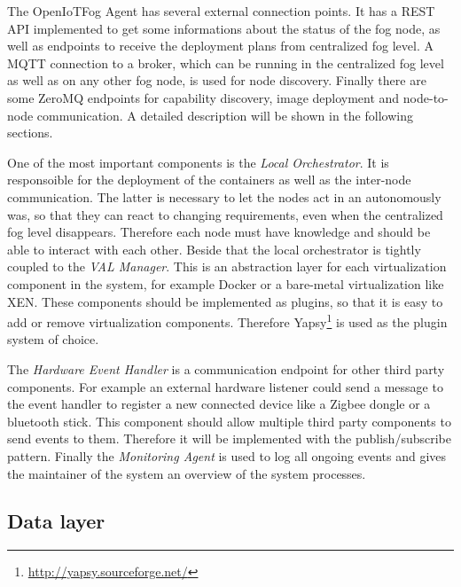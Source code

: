 The OpenIoTFog Agent has several external connection points.
It has a \ac{REST} \ac{API} implemented to get some informations about the status of the fog node, as well as endpoints to receive the deployment plans from centralized fog level.
A \ac{MQTT} connection to a broker, which can be running in the centralized fog level as well as on any other fog node, is used for node discovery.
Finally there are some ZeroMQ endpoints for capability discovery, image deployment and node-to-node communication.
A detailed description will be shown in the following sections.

One of the most important components is the \textit{Local Orchestrator}.
It is responsoible for the deployment of the containers as well as the inter-node communication.
The latter is necessary to let the nodes act in an autonomously was, so that they can react to changing requirements, even when the centralized fog level disappears.
Therefore each node must have knowledge and should be able to interact with each other.
Beside that the local orchestrator is tightly coupled to the \textit{\ac{VAL} Manager}.
This is an abstraction layer for each virtualization component in the system, for example Docker or a bare-metal virtualization like XEN.
These components should be implemented as plugins, so that it is easy to add or remove virtualization components.
Therefore Yapsy\footnote{\url{http://yapsy.sourceforge.net/}} is used as the plugin system of choice.

The \textit{Hardware Event Handler} is a communication endpoint for other third party components.
For example an external hardware listener could send a message to the event handler to register a new connected device like a Zigbee dongle or a bluetooth stick.
This component should allow multiple third party components to send events to them.
Therefore it will be implemented with the publish/subscribe pattern.
Finally the \textit{Monitoring Agent} is used to log all ongoing events and gives the maintainer of the system an overview of the system processes.



\subsection{Data layer}
\doit

